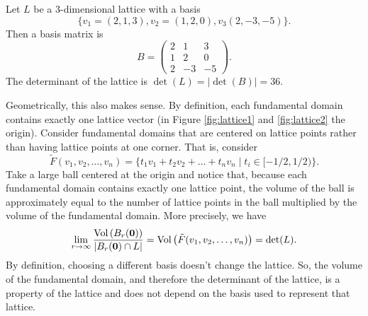 \documentclass[../main.tex]{subfiles}
\begin{document}
\begin{example}
Let $L$ be a 3-dimensional lattice with a basis \[ \{v_1=(2,1,3), v_2=(1,2,0), v_3(2,-3,-5)\}. \] Then a basis matrix is 
\begin{equation}
B = 
\begin{pmatrix}
2&1&3\\
1&2&0\\
2&-3&-5
\end{pmatrix}.
\end{equation}
The determinant of the lattice is $\det(L)=|\det(B)|=36$.
\end{example}

Geometrically, this also makes sense. 
By definition, each fundamental domain contains exactly one lattice vector (in Figure \ref{fig:lattice1} and \ref{fig:lattice2} the origin). 
Consider fundamental domains that are centered on lattice points rather than having lattice points at one corner. That is, consider
\begin{equation*}
\tilde{F}(v_1, v_2, \ldots, v_n) = \{t_1v_1 + t_2v_2 + \ldots + t_nv_n \mid t_i \in [-1/2, 1/2)\}.
\end{equation*}
Take a large ball centered at the origin and notice that, because each fundamental domain contains exactly one lattice point, the volume of the ball is approximately equal to the number of lattice points in the ball multiplied by the volume of the fundamental domain. More precisely, we have
\begin{equation*}
    \lim_{r \rightarrow \infty} \frac{\text{Vol}\left(B_r(\mathbf{0})\right)}{\left|B_r(\mathbf{0}) \cap L\right|} = \text{Vol}\left(\tilde{F}(v_1, v_2, \ldots, v_n)\right) = \det(L).
\end{equation*}
By definition, choosing a different basis doesn't change the lattice. So, the volume of the fundamental domain, and therefore the determinant of the lattice, is a property of the lattice and does not depend on the basis used to represent that lattice.
\end{document}
